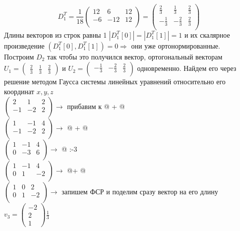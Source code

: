\documentclass[a4paper,12pt]{article}
\makeatletter
\newcommand*{\rom}[1]{\expandafter\@slowromancap\romannumeral #1@}
\newcounter{z}
\makeatother
\begin{document}
\begin{enumerate}
$$D_1^T=\frac{1}{18}\begin{pmatrix}
12&6&12\\
-6&-12&12\\
\end{pmatrix} = \begin{pmatrix}
\frac{2}{3}&\frac{1}{3}&\frac{2}{3}\\
-\frac{1}{3}&-\frac{2}{3}&\frac{2}{3}\\
\end{pmatrix}$$
Длины векторов из строк равны 1 $|D_1^T[0]|=|D_1^T[1]|=1$ и их скалярное произведение $(D_1^T[0],D_1^T[1])=0 \Rightarrow$ они уже ортонормированные.\\
Построим $D_2$ так чтобы это получился вектор, ортогональный векторам $U_1 = \begin{pmatrix}
\frac{2}{3}&\frac{1}{3}&\frac{2}{3}
\end{pmatrix}$ и  $U_2 = \begin{pmatrix}
-\frac{1}{3}&-\frac{2}{3}&\frac{2}{3}\\
\end{pmatrix}$ одновременно. Найдем его через решение методом Гаусса системы линейных уравнений относительно его координат $x,y,z$\\
$
\left(\begin{array}{ccc}  
2&1&2\\
-1&-2&2\\
\end{array}\right) \rightarrow$ прибавим к \rom{1} + \rom{2}\\

$
\left(\begin{array}{ccc}  
1&-1&4\\
-1&-2&2\\
\end{array}\right) \rightarrow$  \rom{2} + \rom{1}\\
$
\left(\begin{array}{ccc}  
1&-1&4\\
0&-3&6\\
\end{array}\right) \rightarrow$  \rom{2} :-3\\
$
\left(\begin{array}{ccc}  
1&-1&4\\
0&1&-2\\
\end{array}\right) \rightarrow$  \rom{1}+ \rom{2}\\
$
\left(\begin{array}{ccc}  
1&0&2\\
0&1&-2\\
\end{array}\right) \rightarrow$  запишем ФСР и поделим сразу вектор на его длину\\
$v_3 = \begin{pmatrix}
-2\\2\\1
\end{pmatrix} \frac{1}{3}$


\end{enumerate}
\end{document}

